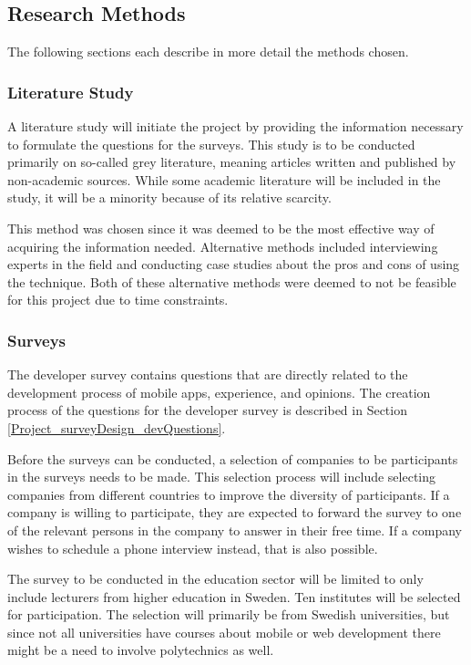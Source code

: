 \documentclass[a4paper,12pt]{article}
\begin{document}
\subsection{Research Methods}
\label{Method_methods}
The following sections each describe in more detail the methods chosen.

\subsubsection{Literature Study}
\label{Method_methods_study}
A literature study will initiate the project by providing the information necessary to formulate the questions for the surveys. This study is to be conducted primarily on so-called grey literature, meaning articles written and published by non-academic sources. While some academic literature will be included in the study, it will be a minority because of its relative scarcity.

This method was chosen since it was deemed to be the most effective way of acquiring the information needed. Alternative methods included interviewing experts in the field and conducting case studies about the pros and cons of using the technique. Both of these alternative methods were deemed to not be feasible for this project due to time constraints.

\subsubsection{Surveys}
\label{Method_methods_surveys}
The developer survey contains questions that are directly related to the development process of mobile apps, experience, and opinions. The creation process of the questions for the developer survey is described in Section \ref{Project_surveyDesign_devQuestions}.

Before the surveys can be conducted, a selection of companies to be participants in the surveys needs to be made. This selection process will include selecting companies from different countries to improve the diversity of participants. If a company is willing to participate, they are expected to forward the survey to one of the relevant persons in the company to answer in their free time. If a company wishes to schedule a phone interview instead, that is also possible.

The survey to be conducted in the education sector will be limited to only include lecturers from higher education in Sweden. Ten institutes will be selected for participation. The selection will primarily be from Swedish universities, but since not all universities have courses about mobile or web development there might be a need to involve polytechnics as well.
\end{document}
